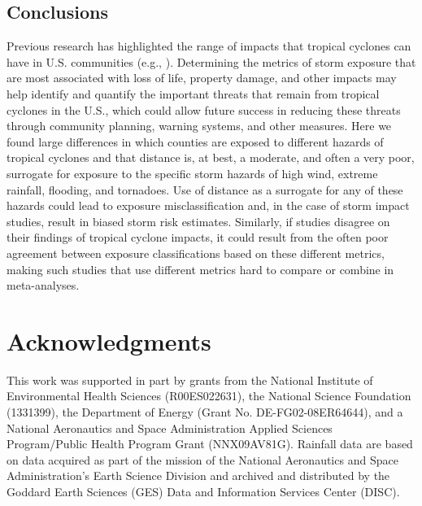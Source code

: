 \documentclass[fleqn,10pt,lineno]{olplainarticle}
\begin{document}
\subsection*{Conclusions}

Previous research has highlighted the range of impacts that tropical cyclones
can have in U.S. communities (e.g., \cite{pielke1997, rappaport2000, liu2005,
han2009, mallin2006}). Determining the metrics of storm exposure that are most
associated with loss of life, property damage, and other impacts may help
identify and quantify the important threats that remain from tropical cyclones
in the U.S., which could allow future success in reducing these threats through
community planning, warning systems, and other measures. Here we found large
differences in which counties are exposed to different hazards of tropical
cyclones and that distance is, at best, a moderate, and often a very poor,
surrogate for exposure to the specific storm hazards of high wind, extreme
rainfall, flooding, and tornadoes. Use of distance as a surrogate for any of
these hazards could lead to exposure misclassification and, in the case of storm
impact studies, result in biased storm risk estimates. Similarly, if studies
disagree on their findings of tropical cyclone impacts, it could result from the
often poor agreement between exposure classifications based on these different
metrics, making such studies that use different metrics hard to compare or
combine in meta-analyses.

\section*{Acknowledgments}

This work was supported in part by grants from the National Institute of
Environmental Health Sciences (R00ES022631), the National Science Foundation
(1331399), the Department of Energy (Grant No. DE-FG02-08ER64644), and a
National Aeronautics and Space Administration Applied Sciences Program/Public
Health Program Grant (NNX09AV81G). Rainfall data are based on data acquired as
part of the mission of the National Aeronautics and Space Administration's Earth
Science Division and archived and distributed by the Goddard Earth Sciences
(GES) Data and Information Services Center (DISC).


\end{document}
